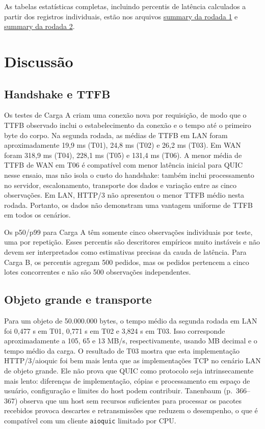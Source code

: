 \documentclass[12pt,a4paper]{article}
\begin{document}
As tabelas estatísticas completas, incluindo percentis de latência calculados a partir dos
registros individuais, estão nos arquivos
\href{results/20261020T194130Z-578/plots/summary.md}{summary da rodada 1} e
\href{results/20261020T205948Z-881/plots/summary.md}{summary da rodada 2}.

\section{Discussão}

\subsection{Handshake e TTFB}

Os testes de Carga A criam uma conexão nova por requisição, de modo que o TTFB observado
inclui o estabelecimento da conexão e o tempo até o primeiro byte do corpo. Na segunda
rodada, as médias de TTFB em LAN foram aproximadamente 19,9 ms (T01), 24,8 ms (T02) e
26,2 ms (T03). Em WAN foram 318,9 ms (T04), 228,1 ms (T05) e 131,4 ms (T06). A menor
média de TTFB de WAN em T06 é compatível com menor latência inicial para QUIC nesse ensaio,
mas não isola o custo do handshake: também inclui processamento no servidor, escalonamento,
transporte dos dados e variação entre as cinco observações. Em LAN, HTTP/3 não apresentou
o menor TTFB médio nesta rodada. Portanto, os dados não demonstram uma vantagem uniforme
de TTFB em todos os cenários.

Os p50/p99 para Carga A têm somente cinco observações individuais por teste, uma por
repetição. Esses percentis são descritores empíricos muito instáveis e não devem ser
interpretados como estimativas precisas da cauda de latência. Para Carga B, os percentis
agregam 500 pedidos, mas os pedidos pertencem a cinco lotes concorrentes e não são 500
observações independentes.

\subsection{Objeto grande e transporte}

Para um objeto de 50.000.000 bytes, o tempo médio da segunda rodada em LAN foi 0,477 s em
T01, 0,771 s em T02 e 3,824 s em T03. Isso corresponde aproximadamente a 105, 65 e 13 MB/s,
respectivamente, usando MB decimal e o tempo médio da carga. O resultado de T03 mostra que
esta implementação HTTP/3/aioquic foi bem mais lenta que as implementações TCP no cenário
LAN de objeto grande. Ele não prova que QUIC como protocolo seja intrinsecamente mais lento:
diferenças de implementação, cópias e processamento em espaço de usuário, configuração e
limites do host podem contribuir. Tanenbaum (p.~366--367) observa que um host sem
recursos suficientes para processar os pacotes recebidos provoca descartes e retransmissões
que reduzem o desempenho, o que é compatível com um cliente \texttt{aioquic} limitado por CPU.
\end{document}
